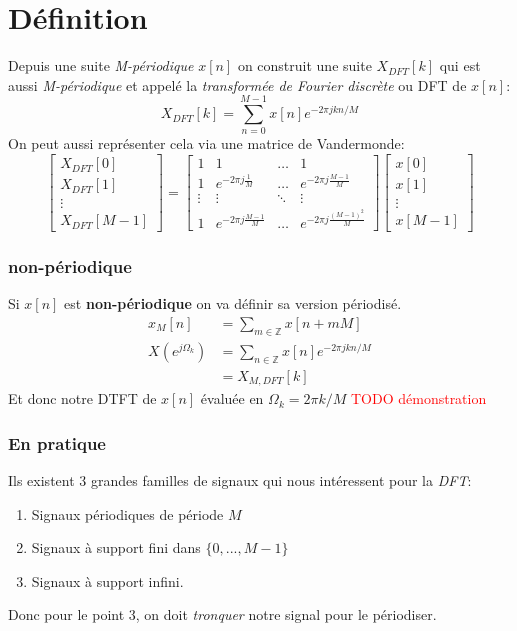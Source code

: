 \documentclass{report}
\begin{document}
\section{Définition}
Depuis une suite \textit{M-périodique} $x[n]$ on construit une suite $X_{DFT}[k]$ qui est aussi \textit{M-périodique} et appelé la \textit{transformée de Fourier discrète} ou DFT de $x[n]$:
\begin{equation}
X_{DFT}[k] = \sum_{n=0}^{M-1}x[n]e^{-2\pi j k n /M}
\end{equation}
On peut aussi représenter cela via une matrice de Vandermonde:
\begin{equation}
\begin{bmatrix}
X_{DFT}[0]\\
X_{DFT}[1]\\
\vdots\\
X_{DFT}[M-1]
\end{bmatrix} =
\begin{bmatrix}
1 & 1 & \ldots & 1\\
1 & e^{-2\pi j \frac{1}{M}} & \ldots & e^{-2\pi j \frac{M-1}{M}}\\
\vdots & \vdots & \ddots & \vdots\\
1 & e^{-2\pi j \frac{M-1}{M}} & \ldots & e^{-2 \pi j \frac{(M-1)^2}{M}} 
\end{bmatrix}
\begin{bmatrix}
x[0]\\
x[1]\\
\vdots \\
x[M-1]
\end{bmatrix}
\end{equation}

\subsubsection{non-périodique}
Si $x[n]$ est \textbf{non-périodique} on va définir sa version périodisé.
\begin{align*}
x_M[n] &= \sum_{m \in \mathbb{Z}} x[n + mM]\\
X(e^{j\Omega_k}) &= \sum_{n\in \mathbb{Z}} x[n]e^{-2\pi j k n/M}\\
&= X_{M, DFT}[k]
\end{align*}
Et donc notre DTFT de $x[n]$ évaluée en $\Omega_k = 2\pi k / M$
\textcolor{red}{TODO démonstration}

\subsubsection{En pratique}
Ils existent 3 grandes familles de signaux qui nous intéressent pour la \textit{DFT}:
\begin{enumerate}
\item Signaux périodiques de période $M$
\item Signaux à support fini dans $\{0, ..., M-1\}$
\item Signaux à support infini.
\end{enumerate}
Donc pour le point 3, on doit \textit{tronquer} notre signal pour le périodiser.
\end{document}
